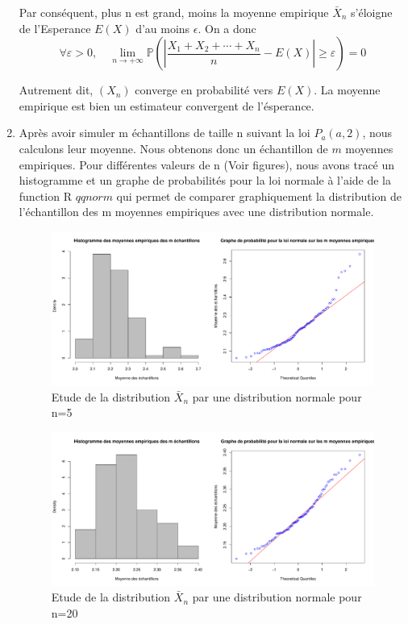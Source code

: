 \documentclass[12pt]{article}
\begin{document}
\begin{enumerate}
Par cons\'{e}quent, plus n est grand, moins la moyenne empirique $\bar X_n$  s'\'{e}loigne de l'Esperance $E(X)$ d'au moins $\epsilon$.
On a donc $$\forall\varepsilon>0,\quad \lim_{n \to +\infty} \mathbb{P}\left(\left|\frac{X_1+X_2+\cdots+X_n}{n} -E(X)\right| \geqslant \varepsilon\right) = 0 $$

Autrement dit, $(X_n)$ converge en probabilit\'{e} vers $E(X)$. La moyenne empirique est bien un estimateur convergent de l'\'{e}sperance.
\\

\item


Apr\`{e}s avoir simuler m \'{e}chantillons de taille n suivant la loi $P_a(a,2)$, nous calculons leur moyenne. Nous obtenons donc un \'{e}chantillon de $m$  moyennes empiriques. Pour diff\'{e}rentes valeurs de n (Voir figures), nous avons trac\'{e} un histogramme et un graphe de probabilit\'{e}s pour la loi normale  \`{a} l'aide de la function R $qqnorm$ qui permet de comparer graphiquement la distribution de l'\'{e}chantillon des m moyennes empiriques avec une distribution normale.
\\
\begin{figure}[H]
\centering
\includegraphics[width=1.0\textwidth]{figures/GraphP2Q51.pdf}
\caption{Etude de la distribution $\bar X_n$ par une distribution normale pour n=5}
\end{figure}

\begin{figure}[H]
\centering
\includegraphics[width=1.0\textwidth]{figures/GraphP2Q52.pdf}
\caption{Etude de la distribution $ \bar X_n$ par une distribution normale pour n=20}
\end{figure}


\end{enumerate}
\end{document}
